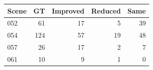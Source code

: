 \begin{tabular}{lrrrr}
\toprule
Scene & GT & Improved & Reduced & Same \\
\midrule
052 & 61 & 17 & 5 & 39 \\
054 & 124 & 57 & 19 & 48 \\
057 & 26 & 17 & 2 & 7 \\
061 & 10 & 9 & 1 & 0 \\
\bottomrule
\end{tabular}
